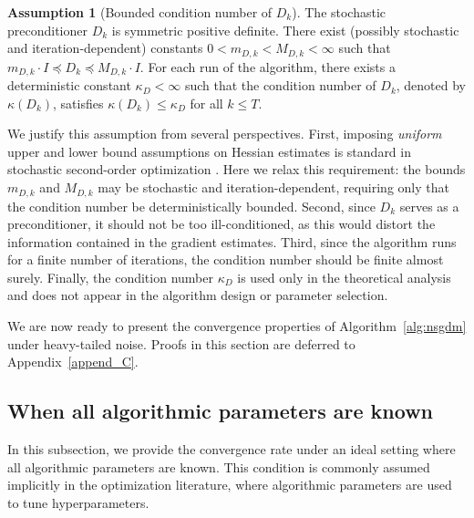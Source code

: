 \documentclass{article}
\theoremstyle{plain}
\theoremstyle{definition}
\newtheorem{assumption}[theorem]{Assumption}
\theoremstyle{remark}
\begin{document}
\begin{assumption}[Bounded condition number of $D_k$]\label{assumption4}
The stochastic preconditioner $D_k$ is symmetric positive definite. There exist (possibly stochastic and iteration-dependent) constants $0<m_{D,k}<M_{D,k}<\infty$ such that $m_{D,k}\cdot I \preceq D_k \preceq M_{D,k}\cdot I$. For each run of the algorithm, there exists a deterministic constant $\kappa_D<\infty$ such that the condition number of $D_k$, denoted by $\kappa(D_k)$, satisfies $\kappa(D_k)\leq \kappa_D$ for all $k \leq T$.
\end{assumption}

We justify this assumption from several perspectives. First, imposing \textit{uniform} upper and lower bound assumptions on Hessian estimates is standard in stochastic second-order optimization \citep{Berahas2021Sequential,Fang2024Trust}. Here we relax this requirement: the bounds $m_{D,k}$ and $M_{D,k}$ may be stochastic and iteration-dependent, requiring only that the condition number be deterministically bounded. Second, since $D_k$ serves as a preconditioner, it should not be too ill-conditioned, as this would distort the information contained in the gradient estimates. Third, since the algorithm runs for a finite number of iterations, the condition number should be finite almost surely. Finally, the condition number $\kappa_D$ is used only in the theoretical analysis and does not appear in the algorithm design or parameter selection.

We are now ready to present the convergence properties of Algorithm~\ref{alg:nsgdm} under heavy-tailed noise. Proofs in this section are deferred to Appendix~\ref{append_C}.

\subsection{When all algorithmic parameters are known}\label{subsec:algo_para_known}


In this subsection, we provide the convergence rate under an ideal setting where all algorithmic parameters are known. This condition is commonly assumed implicitly in the optimization literature, where algorithmic parameters are used to tune  hyperparameters.
\end{document}
